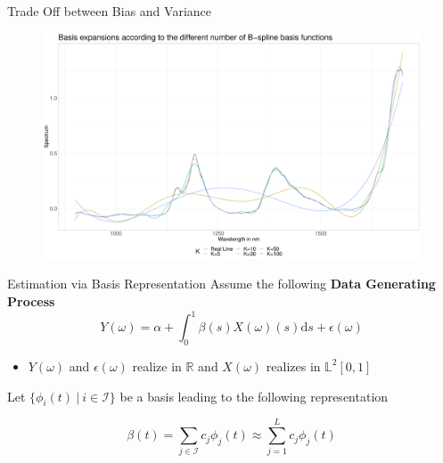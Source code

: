 \documentclass{beamer}
\begin{document}
	\begin{frame}{Trade Off between Bias and Variance}
		\begin{figure}\notag
			\includegraphics[width =
			\textwidth]{../Graphics/basis_expansions.pdf}
		\end{figure}
	\end{frame}

	\begin{frame}{Estimation via Basis Representation}
		Assume the following \textbf{Data Generating Process}
		$$Y(\omega) = \alpha + \int_{0}^{1} \beta(s) X(\omega)(s) \mathrm{d}s + \epsilon(\omega)$$
		\vspace{-0.6cm}
		\begin{itemize}
			\item $Y(\omega)$ and $\epsilon(\omega)$ realize in $\mathbb{R}$ and $X(\omega)$ realizes in $\mathbb{L}^2[0,1]$
		\end{itemize}
		\vspace{0.7cm}
					
		Let $\{\phi_i(t) \: \vert \: i \in \mathcal{I}\}$ be a basis leading to the following representation
		
		$$\beta(t) = \sum_{j \in \mathcal{I}} c_j \phi_j(t) \approx \sum_{j = 1}^{L} c_j \phi_j(t)$$

	\end{frame}
\end{document}
